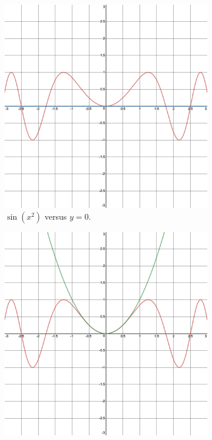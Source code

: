 \documentclass{article}
\begin{document}
\begin{figure}[h!]
    \centering
    \begin{subfigure}[b]{0.3\linewidth}
        \includegraphics[width=\linewidth]{Blender/y-0.png}
        \caption{$\sin(x^2)$ versus $y=0$.}
        \label{fig:6a}
    \end{subfigure}\hspace{1.5em}
    \begin{subfigure}[b]{0.3\linewidth}
        \includegraphics[width=\linewidth]{Blender/y-x2.png}

\end{subfigure}
\end{figure}
\end{document}
